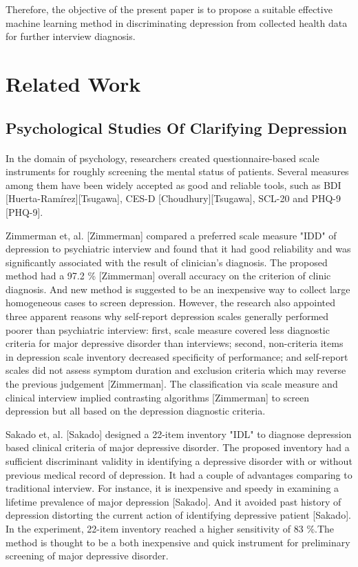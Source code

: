 \documentclass[runningheads]{llncs}
\begin{document}
Therefore, the objective of the present paper is to propose a suitable effective machine learning method in discriminating depression from collected health data for further interview diagnosis. 
%
%         
%
%
%
\pagebreak
\section{Related Work}
\subsection{Psychological Studies Of Clarifying Depression}
% 
%
\paragraph{}
In the domain of psychology, researchers created questionnaire-based scale instruments for roughly screening the mental status of patients. Several measures among them have been widely accepted as good and reliable tools, such as BDI [Huerta-Ramírez][Tsugawa], CES-D [Choudhury][Tsugawa], SCL-20 and PHQ-9 [PHQ-9]. 

Zimmerman et, al. [Zimmerman] compared a preferred scale measure "IDD" of depression to psychiatric interview and found that it had good reliability and was significantly associated with the result of clinician's diagnosis. The proposed method had a 97.2 \% [Zimmerman] overall accuracy on the criterion of clinic diagnosis. And new method is suggested to be an inexpensive way to collect large homogeneous cases to screen depression. However, the research also appointed three apparent reasons why self-report depression scales generally performed poorer than psychiatric interview: first, scale measure covered less diagnostic criteria for major depressive disorder than interviews; second, non-criteria items in depression scale inventory decreased specificity of performance; and self-report scales did not assess symptom duration and exclusion criteria which may reverse the previous judgement [Zimmerman]. The classification via scale measure and clinical interview implied contrasting algorithms [Zimmerman] to screen depression but all based on the depression diagnostic criteria. 

Sakado et, al. [Sakado] designed a 22-item inventory "IDL" to diagnose depression based clinical criteria of major depressive disorder. The proposed inventory had a sufficient discriminant validity in identifying a depressive disorder with or without previous medical record of depression. It had a couple of advantages comparing to traditional interview. For instance, it is inexpensive and speedy in examining a lifetime prevalence of major depression [Sakado]. And it avoided past history of depression distorting the current action of identifying depressive patient [Sakado]. In the experiment, 22-item inventory reached a higher sensitivity of 83 \%.The method is thought to be a both inexpensive and quick instrument for preliminary screening of major depressive disorder. 
\end{document}
